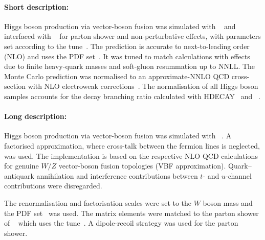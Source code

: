 \paragraph{Short description:}
Higgs boson production via vector-boson fusion was simulated with
\POWHEGBOX[v2]~\cite{Nason:2009ai,Alioli:2010xd,Nason:2004rx,Frixione:2007vw} 
and interfaced with \PYTHIA[8]~\cite{Sjostrand:2014zea} for parton shower and non-perturbative effects,
with parameters set according to the \AZNLO tune~\cite{STDM-2012-23}.
The \POWHEG prediction is accurate to next-to-leading order (NLO) and uses
the \PDFforLHC[15nlo] PDF set~\cite{Butterworth:2015oua}. 
It was tuned to match calculations with effects due to finite heavy-quark masses 
and soft-gluon resummation up to NNLL.
The Monte Carlo prediction was normalised to an approximate-NNLO QCD cross-section 
with NLO electroweak corrections~\cite{Ciccolini:2007jr,Ciccolini:2007ec,Bolzoni:2010xr}. 
The normalisation of all Higgs boson samples accounts for the decay branching ratio calculated 
with \textsc{HDECAY}~\cite{Djouadi:1997yw,Spira:1997dg,Djouadi:2006bz} 
and \PROPHECY~\cite{Bredenstein:2006ha,Bredenstein:2006rh,Bredenstein:2006nk}.




\paragraph{Long description:}
Higgs boson production via vector-boson fusion was simulated with
\POWHEGBOX[v2]~\cite{Nason:2009ai,Alioli:2010xd,Nason:2004rx,Frixione:2007vw}. A factorised approximation, where cross-talk between the
fermion lines is neglected, was used. The implementation is based on the respective NLO QCD calculations for genuine $W/Z$ vector-boson
fusion topologies (VBF approximation). Quark--antiquark annihilation and interference contributions 
between $t$- and $u$-channel contributions were disregarded.

The renormalisation and factorisation scales were set to the $W$ boson mass and the \PDFforLHC[15nlo] PDF set~\cite{Butterworth:2015oua}
was used. The matrix elements were matched to the parton shower of \PYTHIA[8]~\cite{Sjostrand:2014zea} which uses the \AZNLO
tune~\cite{STDM-2012-23}. A dipole-recoil strategy was used for the parton shower.%


